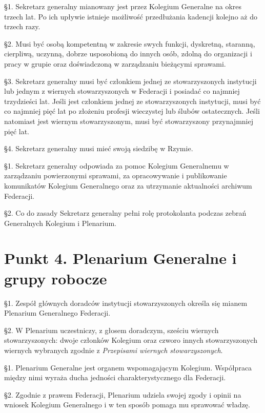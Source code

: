 

 \S{}1. Sekretarz generalny mianowany jest przez Kolegium Generalne na okres trzech lat. Po ich upływie istnieje możliwość przedłużania kadencji kolejno aż do trzech razy.


\S{}2. Musi być osobą kompetentną w zakresie swych funkcji, dyskretną, staranną, cierpliwą, uczynną, dobrze usposobioną do innych osób, zdolną do organizacji i pracy w grupie oraz doświadczoną w zarządzaniu bieżącymi sprawami.


\S{}3. Sekretarz generalny musi być członkiem jednej ze stowarzyszonych instytucji lub jednym z wiernych stowarzyszonych w Federacji i posiadać co najmniej trzydzieści lat. Jeśli jest członkiem jednej ze stowarzyszonych instytucji, musi być co najmniej pięć lat po złożeniu profesji wieczystej lub ślubów ostatecznych. Jeśli natomiast jest wiernym stowarzyszonym, musi być stowarzyszony przynajmniej pięć lat.


\S{}4. Sekretarz generalny musi mieć swoją siedzibę w Rzymie.


 \S{}1. Sekretarz generalny odpowiada za pomoc Kolegium Generalnemu w zarządzaniu powierzonymi sprawami, za opracowywanie i publikowanie komunikatów Kolegium Generalnego oraz za utrzymanie aktualności archiwum Federacji.


\S{}2. Co do zasady Sekretarz generalny pełni rolę protokolanta podczas zebrań Generalnych Kolegium i Plenarium.


\section{Punkt 4. Plenarium Generalne i grupy robocze}
\label{lbl-plenarium-generalne}




 \S{}1. Zespół głównych doradców instytucji stowarzyszonych określa się mianem Plenarium Generalnego Federacji.


\S{}2. W Plenarium uczestniczy, z głosem doradczym, sześciu wiernych stowarzyszonych: dwoje członków Kolegium oraz czworo innych stowarzyszonych wiernych wybranych zgodnie z {\em Przepisami wiernych stowarzyszonych}.




 \S{}1. Plenarium Generalne jest organem wspomagającym Kolegium. Współpraca między nimi wyraża ducha jedności charakterystycznego dla Federacji.


\S{}2. Zgodnie z prawem Federacji, Plenarium udziela swojej zgody i opinii na wniosek Kolegium Generalnego i w ten sposób pomaga mu sprawować władzę.


